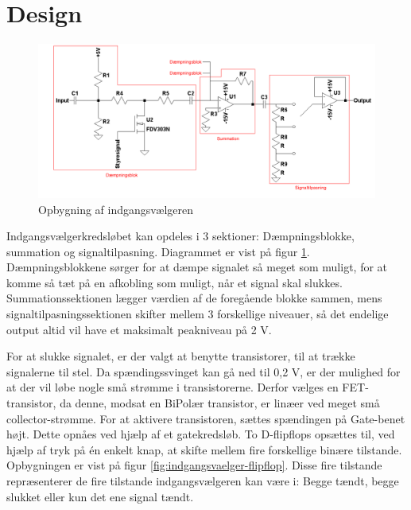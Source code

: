 \section{Design}

\begin{figure}[h]
\centering
\includegraphics[width=\textwidth]{teknisk/indgangsvaelger/signal-taend-sluk.png}
\caption{Opbygning af indgangsvælgeren}
\label{fig:indgangsvaelger-overordnet}
\end{figure}

Indgangsvælgerkredsløbet kan opdeles i 3 sektioner: Dæmpningsblokke, summation og signaltilpasning. Diagrammet er vist på figur \ref{fig:indgangsvaelger-overordnet}. Dæmpningsblokkene sørger for at dæmpe signalet så meget som muligt, for at komme så tæt på en afkobling som muligt, når et signal skal slukkes. Summationssektionen lægger værdien af de foregående blokke sammen, mens signaltilpasningssektionen skifter mellem 3 forskellige niveauer, så det endelige output altid vil have et maksimalt peakniveau på 2 V.  

For at slukke signalet, er der valgt at benytte transistorer, til at trække signalerne til stel. Da spændingssvinget kan gå ned til 0,2 V, er der mulighed for at der vil løbe nogle små strømme i transistorerne. Derfor vælges en FET-transistor, da denne, modsat en BiPolær transistor, er linæer ved meget små collector-strømme. For at aktivere transistoren, sættes spændingen på Gate-benet højt. Dette opnåes ved hjælp af et gatekredsløb. To D-flipflops opsættes til, ved hjælp af tryk på én enkelt knap, at skifte mellem fire forskellige binære tilstande. Opbygningen er vist på figur \ref{fig:indgangsvaelger-flipflop}. Disse fire tilstande repræsenterer de fire tilstande indgangsvælgeren kan være i: Begge tændt, begge slukket eller kun det ene signal tændt.

